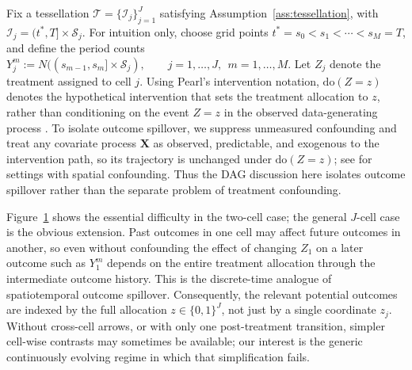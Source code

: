 \documentclass{statsoc}
\newcommand{\1}{\mathbbm{1}}
\newcommand{\CovX}{\mathbf{X}}
\newcommand{\Nproc}{N}
\begin{document}
Fix a tessellation \(\mathcal T=\{\mathcal I_j\}_{j=1}^J\) satisfying Assumption~\ref{ass:tessellation}, with
\(\mathcal I_j=(t^\ast,T]\times \mathcal S_j\). For intuition only, choose grid points \(t^\ast=s_0<s_1<\cdots<s_M=T\), and define the period counts
\(
Y_j^m:=\Nproc((s_{m-1},s_m]\times \mathcal S_j),
\qquad j=1,\ldots,J,\ \ m=1,\ldots,M.
\)
Let \(Z_j\) denote the treatment assigned to cell \(j\). Using Pearl's intervention notation, $\mathrm{do}(Z=z)$ denotes the hypothetical intervention that sets the treatment allocation to $z$, rather than conditioning on the event $Z=z$ in the observed data-generating process \citep{pearl2009causal}. To isolate outcome spillover, we suppress unmeasured confounding and treat any covariate process \(\CovX\) as observed, predictable, and exogenous to the intervention path, so its trajectory is unchanged under \(\mathrm{do}(Z=z)\); see \citet{papadogeorgou2023spatial} for settings with spatial confounding. 
Thus the DAG discussion here isolates outcome spillover rather than the separate problem of treatment confounding.

Figure~\ref{fig:dag_2} shows the essential difficulty in the two-cell case; the general \(J\)-cell case is the obvious extension. Past outcomes in one cell may affect future outcomes in another, so even without confounding the effect of changing \(Z_1\) on a later outcome such as \(Y_1^m\) depends on the entire treatment allocation through the intermediate outcome history. This is the discrete-time analogue of spatiotemporal outcome spillover. Consequently, the relevant potential outcomes are indexed by the full allocation \(z\in\{0,1\}^J\), not just by a single coordinate \(z_j\). Without cross-cell arrows, or with only one post-treatment transition, simpler cell-wise contrasts may sometimes be available; our interest is the generic continuously evolving regime in which that simplification fails.

\begin{figure}[omitted: a diagram of this paper's results, not reproduced here]\label{fig:dag_2}\end{figure}
\end{document}

